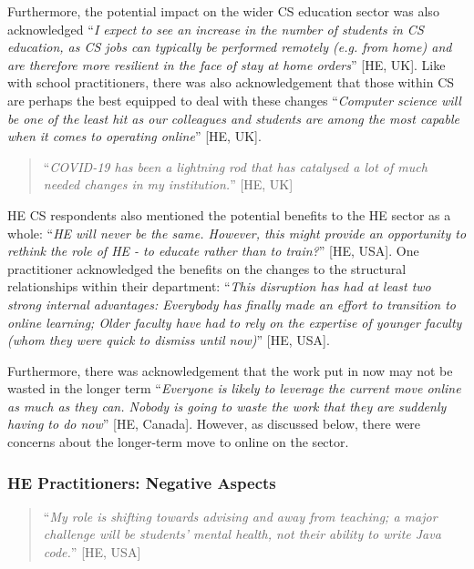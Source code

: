 \documentclass[conference]{IEEEtran}
\begin{document}
Furthermore, the potential impact on the wider CS education sector
was also acknowledged ``{\emph{I expect to see an increase in the
number of students in CS education, as CS jobs can typically be
performed remotely (e.g. from home) and are therefore more resilient
in the face of stay at home orders}}'' [HE, UK]. Like with school
practitioners, there was also acknowledgement that those within
CS are perhaps the best equipped to deal with these changes
``{\emph{Computer science will be one of the least hit as our
colleagues and students are among the most capable when it comes to
operating online}}'' [HE, UK].

\begin{quotation}
``{\emph{COVID-19 has been a lightning rod that has catalysed a lot of
    much needed changes in my institution.}}'' [HE, UK]
\end{quotation}

HE CS respondents also mentioned the potential benefits to the HE
sector as a whole: ``{\emph{HE will never be the same. However, this
might provide an opportunity to rethink the role of HE - to educate
rather than to train?}}'' [HE, USA]. One practitioner acknowledged the
benefits on the changes to the structural relationships within their
department: ``{\emph{This disruption has had at least two strong
internal advantages: Everybody has finally made an effort to
transition to online learning; Older faculty have had to rely on the
expertise of younger faculty (whom they were quick to dismiss until
now)}}'' [HE, USA].

Furthermore, there was acknowledgement that the work put in now may
not be wasted in the longer term ``{\emph{Everyone is likely to
leverage the current move online as much as they can. Nobody is going
to waste the work that they are suddenly having to do now}}''
[HE, Canada]. However, as discussed below, there were concerns about the
longer-term move to online on the sector.

\subsubsection{HE Practitioners: Negative Aspects}

\begin{quotation}
``{\emph{My role is shifting towards advising and away from
teaching; a major challenge will be students' mental health, not their
ability to write Java code.}}'' [HE, USA]
\end{quotation}
\end{document}
